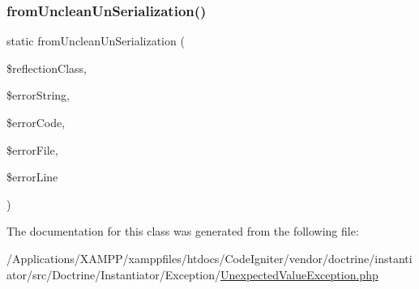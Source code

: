 \subsubsection{\texorpdfstring{from\+Unclean\+Un\+Serialization()}{fromUncleanUnSerialization()}}
{\footnotesize\ttfamily static from\+Unclean\+Un\+Serialization (\begin{DoxyParamCaption}\item[{Reflection\+Class}]{\$reflection\+Class,  }\item[{string}]{\$error\+String,  }\item[{int}]{\$error\+Code,  }\item[{string}]{\$error\+File,  }\item[{int}]{\$error\+Line }\end{DoxyParamCaption})\hspace{0.3cm}{\ttfamily [static]}}



The documentation for this class was generated from the following file\+:\begin{DoxyCompactItemize}
\item 
/\+Applications/\+X\+A\+M\+P\+P/xamppfiles/htdocs/\+Code\+Igniter/vendor/doctrine/instantiator/src/\+Doctrine/\+Instantiator/\+Exception/\mbox{\hyperlink{_unexpected_value_exception_8php}{Unexpected\+Value\+Exception.\+php}}\end{DoxyCompactItemize}
